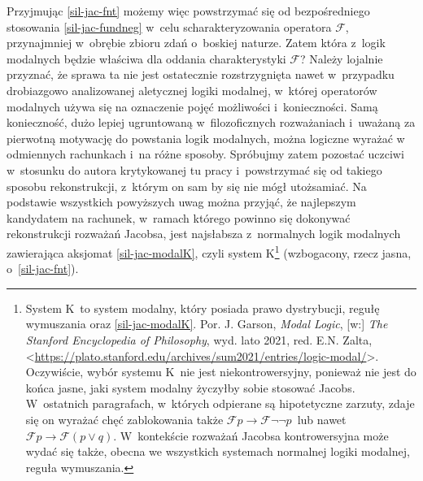 Przyjmując \ref{sil-jac-fnt} możemy więc powstrzymać się od bezpośredniego stosowania \eqref{sil-jac-fundneg} w~celu scharakteryzowania operatora $\mathscr{F}$, przynajmniej w~obrębie zbioru zdań o~boskiej naturze. Zatem która z~logik modalnych będzie właściwa dla oddania charakterystyki $\mathscr{F}$? Należy lojalnie przyznać, że sprawa ta nie jest ostatecznie rozstrzygnięta nawet w~przypadku drobiazgowo analizowanej aletycznej logiki modalnej, w~której operatorów modalnych używa się na oznaczenie pojęć możliwości i~konieczności. Samą konieczność, dużo lepiej ugruntowaną w~filozoficznych rozważaniach i~uważaną za pierwotną motywację do powstania logik modalnych, można logiczne wyrażać w odmiennych rachunkach i~na różne sposoby. Spróbujmy zatem pozostać uczciwi w~stosunku do autora krytykowanej tu pracy i~powstrzymać się od takiego sposobu rekonstrukcji, z~którym on sam by się nie mógł utożsamiać. Na podstawie wszystkich powyższych uwag można przyjąć, że najlepszym kandydatem na rachunek, w~ramach którego powinno się dokonywać rekonstrukcji rozważań Jacobsa, jest najsłabsza z~normalnych logik modalnych zawierająca aksjomat \eqref{sil-jac-modalK}, czyli system K\footnote{System K~to system modalny, który posiada prawo dystrybucji, regułę wymuszania oraz \ref{sil-jac-modalK}. Por. J. Garson, \textit{Modal Logic}, [w:] \textit{The Stanford Encyclopedia of Philosophy}, wyd. lato 2021, red. E.N. Zalta, {\textless}\url{https://plato.stanford.edu/archives/sum2021/entries/logic-modal/}{\textgreater}. Oczywiście, wybór systemu K~nie jest niekontrowersyjny, ponieważ nie jest do końca jasne, jaki system modalny życzyłby sobie stosować Jacobs. W~ostatnich paragrafach, w~których odpierane są hipotetyczne zarzuty, zdaje się on wyrażać chęć zablokowania także $ \mathscr{F} p \to \mathscr{F} \neg \neg p$~lub nawet $ \mathscr{F} p \to \mathscr{F} (p \lor q)$. W~kontekście rozważań Jacobsa kontrowersyjna może wydać się także, obecna we wszystkich systemach normalnej logiki modalnej, reguła wymuszania.} (wzbogacony, rzecz jasna, o~\ref{sil-jac-fnt}).

